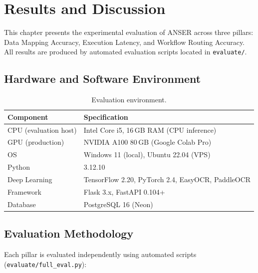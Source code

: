 \documentclass[11pt,a4paper]{report}
\begin{document}
\chapter{Results and Discussion}
\label{ch:results}

This chapter presents the experimental evaluation of ANSER across three pillars: Data Mapping Accuracy, Execution Latency, and Workflow Routing Accuracy. All results are produced by automated evaluation scripts located in \texttt{evaluate/}.

\section{Hardware and Software Environment}

\begin{table}[H]
\centering
\caption{Evaluation environment.}
\label{tab:eval-env}
\small
\begin{tabular}{ll}
\toprule
\textbf{Component} & \textbf{Specification} \\
\midrule
CPU (evaluation host)  & Intel Core i5, 16\,GB RAM (CPU inference) \\
GPU (production)       & NVIDIA A100 80\,GB (Google Colab Pro) \\
OS                     & Windows 11 (local), Ubuntu 22.04 (VPS) \\
Python                 & 3.12.10 \\
Deep Learning          & TensorFlow 2.20, PyTorch 2.4, EasyOCR, PaddleOCR \\
Framework              & Flask 3.x, FastAPI 0.104+ \\
Database               & PostgreSQL 16 (Neon) \\
\bottomrule
\end{tabular}
\end{table}

\section{Evaluation Methodology}

Each pillar is evaluated independently using automated scripts (\texttt{evaluate/full\_eval.py}):
\end{document}
